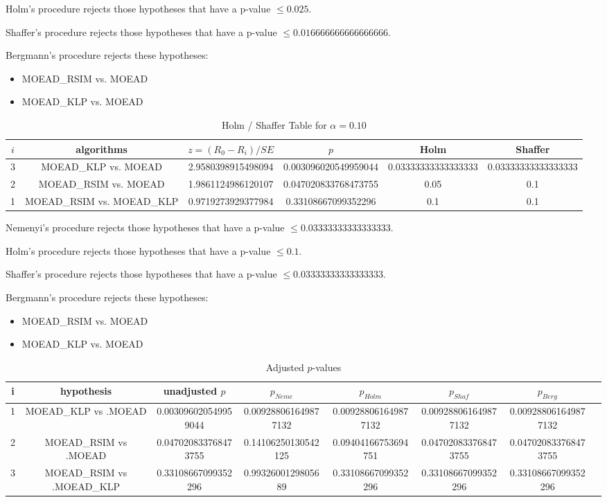 \documentclass[a4paper,10pt]{article}
\begin{document}
\begin{landscape}
Holm's procedure rejects those hypotheses that have a p-value $\le0.025$.


Shaffer's procedure rejects those hypotheses that have a p-value $\le0.016666666666666666$.


Bergmann's procedure rejects these hypotheses:


\begin{itemize}


\item MOEAD_RSIM vs. MOEAD
\item MOEAD_KLP vs. MOEAD
\end{itemize}


\begin{table}[!htp]
\centering\tiny
\caption{Holm / Shaffer Table for $\alpha=0.10$}
\begin{tabular}{cccccc}
$i$&algorithms&$z=(R_0 - R_i)/SE$&$p$&Holm&Shaffer\\
\hline
3&MOEAD_KLP vs. MOEAD&2.9580398915498094&0.003096020549959044&0.03333333333333333&0.03333333333333333\\
2&MOEAD_RSIM vs. MOEAD&1.9861124986120107&0.047020833768473755&0.05&0.1\\
1&MOEAD_RSIM vs. MOEAD_KLP&0.9719273929377984&0.33108667099352296&0.1&0.1\\
\hline
\end{tabular}
\end{table}
Nemenyi's procedure rejects those hypotheses that have a p-value $\le0.03333333333333333$.


Holm's procedure rejects those hypotheses that have a p-value $\le0.1$.


Shaffer's procedure rejects those hypotheses that have a p-value $\le0.03333333333333333$.


Bergmann's procedure rejects these hypotheses:


\begin{itemize}


\item MOEAD_RSIM vs. MOEAD
\item MOEAD_KLP vs. MOEAD
\end{itemize}


\begin{table}[!htp]
\centering\tiny
\caption{Adjusted $p$-values}
\begin{tabular}{cccccccc}
i&hypothesis&unadjusted $p$&$p_{Neme}$&$p_{Holm}$&$p_{Shaf}$&$p_{Berg}$\\
\hline
1&MOEAD_KLP vs .MOEAD&0.003096020549959044&0.009288061649877132&0.009288061649877132&0.009288061649877132&0.009288061649877132\\
2&MOEAD_RSIM vs .MOEAD&0.047020833768473755&0.14106250130542125&0.09404166753694751&0.047020833768473755&0.047020833768473755\\
3&MOEAD_RSIM vs .MOEAD_KLP&0.33108667099352296&0.9932600129805689&0.33108667099352296&0.33108667099352296&0.33108667099352296\\
\hline
\end{tabular}
\end{table}

\end{landscape}
\end{document}
